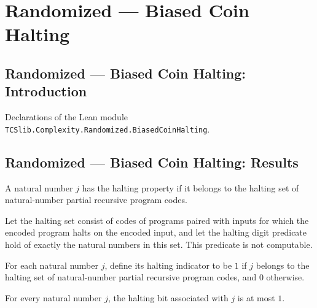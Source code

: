 \section{Randomized --- Biased Coin Halting}
\subsection*{Randomized --- Biased Coin Halting: Introduction}

Declarations of the Lean module \texttt{TCSlib.Complexity.Randomized.BiasedCoinHalting}.

\subsection*{Randomized --- Biased Coin Halting: Results}

\begin{definition}
\label{Randomized.haltDigit}
\leanok
{}
A natural number $j$ has the halting property if it belongs to the halting set of
natural-number partial recursive program codes.
\end{definition}

\begin{theorem}
\label{Randomized.not_computablePred_haltDigit}
\leanok
{}
Let the halting set consist of codes of programs paired with inputs for which the
encoded program halts on the encoded input, and let the halting digit predicate hold of
exactly the natural numbers in this set. This predicate is not computable.
\end{theorem}

\begin{definition}
\label{Randomized.haltBit}
\leanok
{}
For each natural number $j$, define its halting indicator to be $1$ if $j$ belongs to
the halting set of natural-number partial recursive program codes, and $0$ otherwise.
\end{definition}

\begin{theorem}
\label{Randomized.haltBit_le_one}
\leanok
{}
For every natural number $j$, the halting bit associated with $j$ is at most $1$.
\end{theorem}

